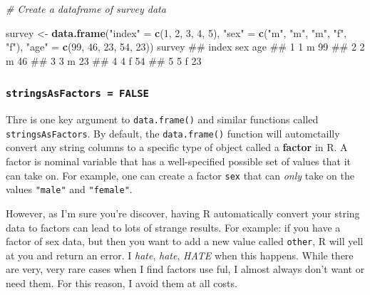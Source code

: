 \documentclass[]{book}
\newenvironment{Shaded}{\begin{snugshade}}{\end{snugshade}}
\newcommand{\KeywordTok}[1]{\textcolor[rgb]{0.13,0.29,0.53}{\textbf{{#1}}}}
\newcommand{\DecValTok}[1]{\textcolor[rgb]{0.00,0.00,0.81}{{#1}}}
\newcommand{\StringTok}[1]{\textcolor[rgb]{0.31,0.60,0.02}{{#1}}}
\newcommand{\CommentTok}[1]{\textcolor[rgb]{0.56,0.35,0.01}{\textit{{#1}}}}
\newcommand{\NormalTok}[1]{{#1}}
\theoremstyle{definition}
\theoremstyle{definition}
\theoremstyle{remark}
\begin{document}
\begin{Shaded}
\begin{Highlighting}[]
\CommentTok{# Create a dataframe of survey data}

\NormalTok{survey <-}\StringTok{ }\KeywordTok{data.frame}\NormalTok{(}\StringTok{"index"} \NormalTok{=}\StringTok{ }\KeywordTok{c}\NormalTok{(}\DecValTok{1}\NormalTok{, }\DecValTok{2}\NormalTok{, }\DecValTok{3}\NormalTok{, }\DecValTok{4}\NormalTok{, }\DecValTok{5}\NormalTok{),}
                     \StringTok{"sex"} \NormalTok{=}\StringTok{ }\KeywordTok{c}\NormalTok{(}\StringTok{"m"}\NormalTok{, }\StringTok{"m"}\NormalTok{, }\StringTok{"m"}\NormalTok{, }\StringTok{"f"}\NormalTok{, }\StringTok{"f"}\NormalTok{),}
                     \StringTok{"age"} \NormalTok{=}\StringTok{ }\KeywordTok{c}\NormalTok{(}\DecValTok{99}\NormalTok{, }\DecValTok{46}\NormalTok{, }\DecValTok{23}\NormalTok{, }\DecValTok{54}\NormalTok{, }\DecValTok{23}\NormalTok{))}
\NormalTok{survey}
\NormalTok{##   index sex age}
\NormalTok{## 1     1   m  99}
\NormalTok{## 2     2   m  46}
\NormalTok{## 3     3   m  23}
\NormalTok{## 4     4   f  54}
\NormalTok{## 5     5   f  23}
\end{Highlighting}
\end{Shaded}

\subsubsection{\texorpdfstring{\texttt{stringsAsFactors\ =\ FALSE}}{stringsAsFactors = FALSE}}\label{stringsasfactors-false}

Thre is one key argument to \texttt{data.frame()} and similar functions
called \texttt{stringsAsFactors}. By default, the \texttt{data.frame()}
function will automctailly convert any string columns to a specific type
of object called a \textbf{factor} in R. A factor is nominal variable
that has a well-specified possible set of values that it can take on.
For example, one can create a factor \texttt{sex} that can \emph{only}
take on the values \texttt{"male"} and \texttt{"female"}.

However, as I'm sure you're discover, having R automatically convert
your string data to factors can lead to lots of strange results. For
example: if you have a factor of sex data, but then you want to add a
new value called \texttt{other}, R will yell at you and return an error.
I \emph{hate}, \emph{hate}, \emph{HATE} when this happens. While there
are very, very rare cases when I find factors use ful, I almost always
don't want or need them. For this reason, I avoid them at all costs.
\end{document}
